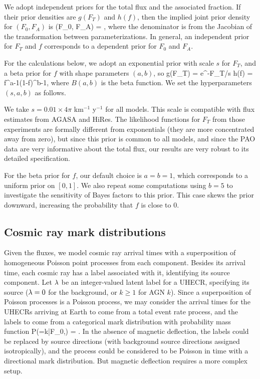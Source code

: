 We adopt independent priors for the total flux and the associated fraction.
If their prior densities are $g(F_T)$ and $h(f)$, then the implied
joint prior density for $(F_0,F_A)$ is
\be
\pi(F_0, F_A) =
  ,
\label{FF-prior}
\ee
where the denominator is from the Jacobian of the transformation between
parameterizations.  In general, an independent prior for $F_T$ and $f$
corresponds to a dependent prior for $F_0$ and $F_A$.

For the calculations below, we adopt an exponential prior with scale $s$ for
$F_T$, and a beta prior for $f$ with shape parameters $(a,b)$, so
\be
g(F_T) = e^{-F_T/s}
\quad{}\quad
h(f) =  f^{a-1}(1-f)^{b-1},
\label{exp-beta}
\ee
where $B(a,b)$ is the beta function.  We set the hyperparameters $(s,a,b)$
as follows.

We take $s = 0.01\times 4\pi$ km$^{-1}$ y$^{-1}$ for all models.  This scale
is compatible with flux estimates from AGASA and HiRes.  The likelihood
functions for $F_T$ from those experiments are formally different from
exponentials (they are more concentrated away from zero), but since this
prior is common to all models, and since the PAO data are very informative
about the total flux, our results are very robust to its detailed
specification.

For the beta prior for $f$, our default choice is $a=b=1$, which corresponds
to a uniform prior on $[0,1]$.  We also repeat some computations using $b=5$
to investigate the sensitivity of Bayes factors to this prior.  This case
skews the prior downward, increasing the probability that $f$ is close to 0.

\subsection{Cosmic ray mark distributions}

Given the fluxes, we model cosmic ray arrival times with a superposition of
homogeneous Poisson point processes from each component.  Besides its
arrival time, each cosmic ray has a label associated with it, identifying
its source component. Let $\lambda$ be an integer-valued latent label for a
UHECR, specifying its source ($\lambda = 0$ for the background, or $k \ge 1$
for AGN $k$).  Since a superposition of Poisson processes is a Poisson
process, we may consider the arrival times for the UHECRs arriving at Earth
to come from a total event rate process, and the labels to come from a
categorical mark distribution with probability mass function
\be
P(\lambda=k|F_0,\Fvec) = .
\label{label-pmf}
\ee
In the absence of magnetic deflection, the labels could be replaced by
source directions (with background source directions assigned
isotropically), and the process could be considered to be Poisson in time
with a directional mark distribution.  But magnetic deflection requires a
more complex setup.

